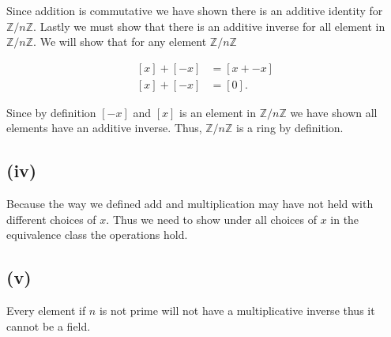 \documentclass{article}
\begin{document}
        Since addition is commutative we have shown there is an additive identity for $\mathbb{Z}/n\mathbb{Z}$. Lastly we must show that there is an additive inverse for all element in $\mathbb{Z}/n\mathbb{Z}$. We will show that for any element $\mathbb{Z}/n\mathbb{Z}$

        \begin{equation*}
          \begin{split}
            [x] + [-x] &= [x + -x]\\
            [x] + [-x]&= [0].
          \end{split}
        \end{equation*}

        Since by definition $[-x]$ and $[x]$ is an element in $\mathbb{Z}/n\mathbb{Z}$ we have shown all elements have an additive inverse. Thus, $\mathbb{Z}/n\mathbb{Z}$ is a ring by definition.

    \subsection*{(iv)}
        Because the way we defined add and multiplication may have not held with different choices of $x$. Thus we need to show under all choices of $x$ in the equivalence class the operations hold.

    \subsection*{(v)}
        Every element if $n$ is not prime will not have a multiplicative inverse thus it cannot be a field.
\end{document}
